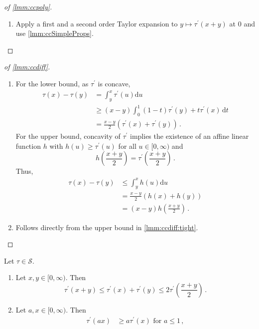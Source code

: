\documentclass{article}
\newcommand{\lb}{\left(} %
\newcommand{\rb}{\right)} %
\newcommand{\br}[1]{\lb #1 \rb} %
\newcommand{\brOf}[1]{\!\br{#1}} %
\newcommand*{\mc}[1]{\mathcal{#1}}
\newcommand{\Rp}{[0, \infty)} %
\newcommand{\pr}{^\prime}
\newcommand{\dl}{\mathrm{d}}
\newcommand{\equationFullstop}{\, .}
\newcommand{\eqfs}{\equationFullstop}
\newcommand{\equationComma}{\, ,}
\newcommand{\eqcm}{\equationComma}
\newcommand{\tran}{\tau}
\newcommand{\dtran}{\tran\pr}
\newcommand{\setcc}{\mc S}
\begin{document}
\begin{appendix}
\begin{proof}[of \cref{lmm:ccpoly}]
\begin{enumerate}[label=(\roman*)]
		\item Apply a first and a second order Taylor expansion to $y\mapsto \dtran(x + y)$ at $0$ and use \cref{lmm:ccSimpleProps}.
	\end{enumerate}
\end{proof}
%
%
\begin{proof}[of \cref{lmm:ccdiff}]
	\begin{enumerate}[label=(\roman*)]
		\item[\ref{lmm:ccdiff:tight}]
		For the lower bound, as $\dtran$ is concave,
		\begin{align*}
			\tran(x) - \tran(y) 
			&= 
			\int_y^x \dtran(u) \dl u
			\\&\geq
			(x-y)\int_0^1 (1-t)\dtran(y) + t \dtran(x)\, \dl t
			\\&=
			\frac {x-y}2 \br{\dtran(x)+\dtran(y)}
			\eqfs
		\end{align*}
		For the upper bound, concavity of $\dtran$ implies the existence of an affine linear function $h$ with $h(u) \geq \dtran(u)$ for all $u \in\Rp$ and 
		\begin{equation}
			h\brOf{\frac{x+y}{2}} = \dtran\brOf{\frac{x+y}{2}}
			\eqfs
		\end{equation}
		Thus,
		\begin{align*}
			\tran(x) - \tran(y) 
			&\leq
			\int_y^x h(u) \dl u
			\\&=
			\frac {x-y}2\br{h(x)+h(y)}
			\\&=
			(x-y) h\brOf{\frac{x+y}{2}}
			\eqfs
		\end{align*}
		\item[\ref{lmm:ccdiff:tightabs}]
		Follows directly from the upper bound in \ref{lmm:ccdiff:tight}.
	\end{enumerate}
\end{proof}
%
%
\begin{lemma}\label{lmm:tranconcave}
	Let $\tran\in\setcc$.
	\begin{enumerate}[label=(\roman*)]
		\item \label{lmm:tranconcave:add}
		Let $x,y\in\Rp$. Then
		\begin{equation*}
			\dtran(x + y) \leq \dtran(x) +  \dtran(y) \leq 2 \dtran\brOf{\frac{x+y}2}
			\eqfs
		\end{equation*}
		\item\label{lmm:tranconcave:factor} Let $a,x\in\Rp$. Then
		\begin{align*}
			\dtran(ax) &\geq a\dtran(x) \text{ for } a\leq 1\eqcm\\

\end{align*}
\end{enumerate}
\end{lemma}
\end{appendix}
\end{document}
